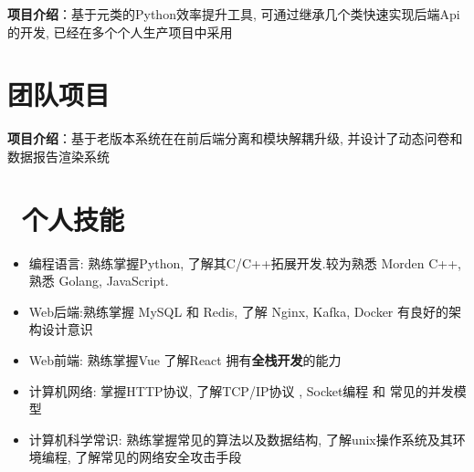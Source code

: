 \documentclass{resume}
\begin{document}
\begin{onehalfspacing}
\textbf{项目介绍}：\quad 基于元类的Python效率提升工具, 可通过继承几个类快速实现后端Api的开发, 已经在多个个人生产项目中采用
\end{onehalfspacing}


\section{\faObjectGroup 团队项目}
\begin{onehalfspacing}
  \textbf{项目介绍}：\quad 基于老版本系统在在前后端分离和模块解耦升级, 并设计了动态问卷和数据报告渲染系统
\end{onehalfspacing}


\section{\faCogs\ 个人技能}
\begin{itemize}[parsep=0.5ex]
  \item 编程语言: 熟练掌握Python, 了解其C/C++拓展开发.较为熟悉 Morden C++, 熟悉 Golang, JavaScript.
  \item Web后端:熟练掌握 MySQL 和 Redis,
  了解 Nginx, Kafka,  Docker
  有良好的架构设计意识
  \item Web前端: 熟练掌握Vue 了解React 拥有\textbf{全栈开发}的能力
  \item 计算机网络: 掌握HTTP协议, 了解TCP/IP协议 , Socket编程 和 常见的并发模型 
  \item 计算机科学常识: 熟练掌握常见的算法以及数据结构,
  了解unix操作系统及其环境编程, 
  了解常见的网络安全攻击手段
\end{itemize}
\end{document}
